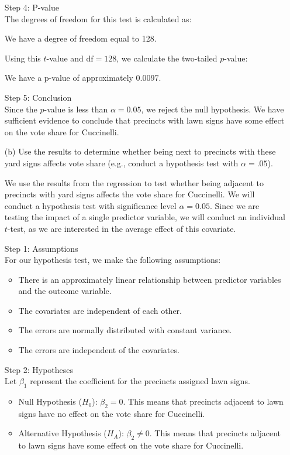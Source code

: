 \documentclass[12pt,letterpaper]{article}
\begin{document}
\begin{enumerate}
	Step 4: P-value\\
	The degrees of freedom for this test is calculated as:
	
	We have  a degree of freedom equal to 128.
	
	Using this \( t \)-value and \( \text{df} = 128 \), we calculate the two-tailed \( p \)-value:
	
	We have a p-value of approximately 0.0097.
	
	Step 5: Conclusion\\
	Since the \( p \)-value is less than \( \alpha = 0.05 \), we reject the null hypothesis. We have sufficient evidence to conclude that precincts with lawn signs have some effect on the vote share for Cuccinelli.
	
		
	\newpage		
	\item [(b)]  Use the results to determine whether being
	next to precincts with these yard signs affects vote
	share (e.g., conduct a hypothesis test with $\alpha = .05$).
	
	We use the results from the regression to test whether being adjacent to precincts with yard signs affects the vote share for Cuccinelli. We will conduct a hypothesis test with significance level \( \alpha = 0.05 \).
	Since we are testing the impact of a single predictor variable, we will conduct an individual \( t \)-test, as we are interested in the average effect of this covariate.
	
	
	Step 1: Assumptions\\
	For our hypothesis test, we make the following assumptions:
	\begin{itemize}
		\item There is an approximately linear relationship between predictor variables and the outcome variable.
		\item The covariates are independent of each other.
		\item The errors are normally distributed with constant variance.
		\item The errors are independent of the covariates.
	\end{itemize}
	
	Step 2: Hypotheses\\
	Let \( \beta_1 \) represent the coefficient for the precincts assigned lawn signs.
	\begin{itemize}
		\item Null Hypothesis (\( H_0 \)): \( \beta_2 = 0 \). This means that precincts adjacent to lawn signs have no effect on the vote share for Cuccinelli.
		\item Alternative Hypothesis (\( H_A \)): \( \beta_2 \neq 0 \). This means that precincts adjacent to lawn signs have some effect on the vote share for Cuccinelli.
	\end{itemize}
	

\end{enumerate}
\end{document}
